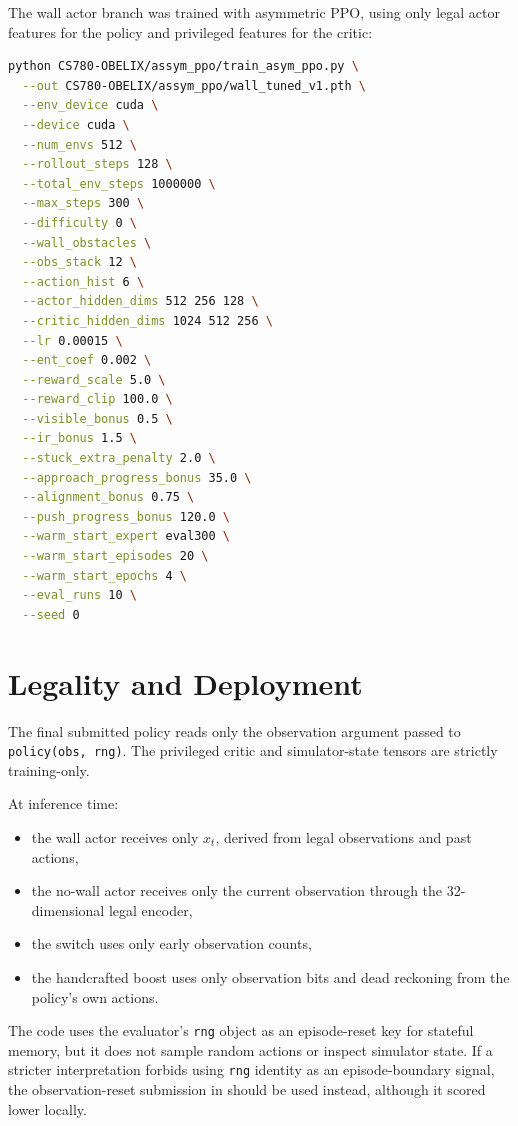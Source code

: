 \documentclass[11pt]{article}
\begin{document}
The wall actor branch was trained with asymmetric PPO, using only legal actor features
for the policy and privileged features for the critic:

\begin{lstlisting}[language=bash]
python CS780-OBELIX/assym_ppo/train_asym_ppo.py \
  --out CS780-OBELIX/assym_ppo/wall_tuned_v1.pth \
  --env_device cuda \
  --device cuda \
  --num_envs 512 \
  --rollout_steps 128 \
  --total_env_steps 1000000 \
  --max_steps 300 \
  --difficulty 0 \
  --wall_obstacles \
  --obs_stack 12 \
  --action_hist 6 \
  --actor_hidden_dims 512 256 128 \
  --critic_hidden_dims 1024 512 256 \
  --lr 0.00015 \
  --ent_coef 0.002 \
  --reward_scale 5.0 \
  --reward_clip 100.0 \
  --visible_bonus 0.5 \
  --ir_bonus 1.5 \
  --stuck_extra_penalty 2.0 \
  --approach_progress_bonus 35.0 \
  --alignment_bonus 0.75 \
  --push_progress_bonus 120.0 \
  --warm_start_expert eval300 \
  --warm_start_episodes 20 \
  --warm_start_epochs 4 \
  --eval_runs 10 \
  --seed 0
\end{lstlisting}

\section{Legality and Deployment}

The final submitted policy reads only the observation argument passed to
\texttt{policy(obs, rng)}. The privileged critic and simulator-state tensors are strictly
training-only.

At inference time:
\begin{itemize}[leftmargin=1.5em]
  \item the wall actor receives only \(x_t\), derived from legal observations and past
  actions,
  \item the no-wall actor receives only the current observation through the 32-dimensional
  legal encoder,
  \item the switch uses only early observation counts,
  \item the handcrafted boost uses only observation bits and dead reckoning from the
  policy's own actions.
\end{itemize}
The code uses the evaluator's \texttt{rng} object as an episode-reset key for stateful
memory, but it does not sample random actions or inspect simulator state. If a stricter
interpretation forbids using \texttt{rng} identity as an episode-boundary signal, the
observation-reset submission in  should be used instead, although it
scored lower locally.
\end{document}
